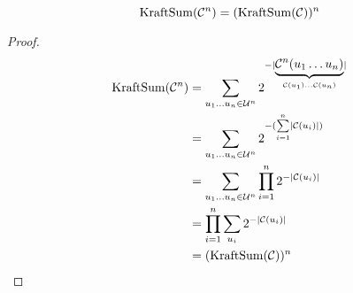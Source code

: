\begin{proposition}
    \[
        \operatorname{KraftSum}(\mathcal{C}^n) = (\operatorname{KraftSum}(\mathcal{C}))^n
    \]
\end{proposition}
\begin{proof}
    \[
        \begin{aligned}
            \operatorname{KraftSum}(\mathcal{C}^n) &= \sum\limits_{u_1\ldots u_n\in\mathcal{U}^n} 2^{-\lvert \underbrace{\mathcal{C}^n(u_1\ldots u_n)}_{\mathcal{C}(u_1)\ldots\mathcal{C}(u_n)} \rvert}\\
            &= \sum\limits_{u_1\ldots u_n\in\mathcal{U}^n} 2^{-(\sum\limits_{i=1}^n\lvert \mathcal{C}(u_i) \rvert)}\\
            &= \sum\limits_{u_1\ldots u_n\in\mathcal{U}^n} \prod\limits_{i=1}^n 2^{-\lvert\mathcal{C}(u_i) \rvert}\\
            &= \prod\limits_{i=1}^n \sum\limits_{u_i}2^{-\lvert \mathcal{C}(u_i)\rvert}\\
            &= (\operatorname{KraftSum(\mathcal{C})})^n
        \end{aligned}
    \]
\end{proof}